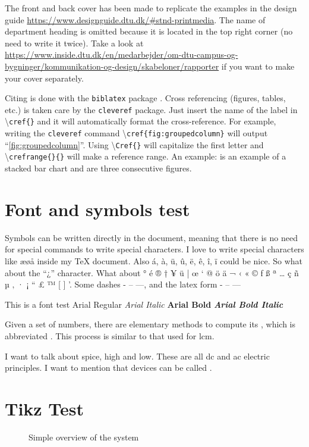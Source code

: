 The front and back cover has been made to replicate the examples in the design guide \url{https://www.designguide.dtu.dk/#stnd-printmedia}. The name of department heading is omitted because it is located in the top right corner (no need to write it twice). Take a look at \url{https://www.inside.dtu.dk/en/medarbejder/om-dtu-campus-og-bygninger/kommunikation-og-design/skabeloner/rapporter} if you want to make your cover separately. 

Citing is done with the \texttt{biblatex} package \cite{biblatex}. Cross referencing (figures, tables, etc.) is taken care by the \texttt{cleveref} package. Just insert the name of the label in \textbackslash \texttt{cref\{\}} and it will automatically format the cross-reference. For example, writing the \texttt{cleveref} command \textbackslash \texttt{cref\{fig:groupedcolumn\}} will output ``\cref{fig:groupedcolumn}''. Using \textbackslash \texttt{Cref\{\}} will capitalize the first letter and \textbackslash \texttt{crefrange\{\}\{\}} will make a reference range. An example:  is an example of a stacked bar chart and  are three consecutive figures.

\section{Font and symbols test}
Symbols can be written directly in the document, meaning that there is no need for special commands to write special characters. I love to write special characters like æøå inside my \TeX{} document. Also á, à, ü, û, ë, ê, î, ï could be nice. So what about the ``¿'' character. What about ° é ® † ¥ ü | œ ‘ @ ö ä ¬ ‹ « © ƒ ß ª … ç ñ µ ‚ · ¡ “ £ ™ [ ] '. Some dashes - – —, and the latex form - -- --- 

This is a font test \newline 
Arial Regular \newline 
\textit{Arial Italic} \newline 
\textbf{Arial Bold} \newline 
\textbf{\textit{Arial Bold Italic}}


Given a set of numbers, there are elementary methods to compute 
its , which is abbreviated . This 
process is similar to that used for \acrfull{lcm}.

I want to talk about \gls{spice}, \gls{high} and \gls{low}. These are all \gls{dc} and \gls{ac} electric principles. I want to mention that  devices can be called .

\section{Tikz Test}
\begin{figure}[h]
	\centering 
	\resizebox{\textwidth}{!}{
		
	}
	\caption{Simple overview of the system}
	\label{fig:system_overview}
\end{figure}

